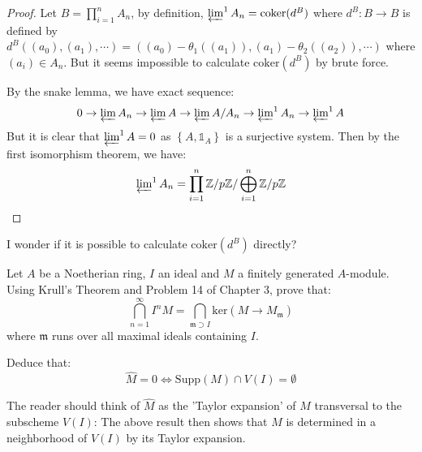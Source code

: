 \documentclass{solution}
\begin{document}
\begin{proof}
    Let $B = \prod\limits_{i = 1}^{n} A_n$, by definition, $\varprojlim^1 A_n = \mathrm{coker}(d^{B})$ where $d^{B}: B \rightarrow B$ is defined by $d^B((a_{0}), (a_1), \cdots) = ((a_0) - \theta_1((a_1)), (a_1) - \theta_2((a_2)), \cdots)$ where $(a_i) \in A_n$. But it seems impossible to calculate $\mathrm{coker}(d^B)$ by brute force.

    By the snake lemma, we have exact sequence:
    $$0 \rightarrow \varprojlim A_n \rightarrow \varprojlim A \rightarrow \varprojlim A / A_n \rightarrow \varprojlim\nolimits^1 A_n \rightarrow \varprojlim\nolimits^1 A$$
    But it is clear that $\varprojlim\nolimits^1 A = 0$ as $\left\lbrace A, \mathds{1}_A \right\rbrace$ is a surjective system. Then by the first isomorphism theorem, we have:
    $$\varprojlim\nolimits^1 A_n = \prod\limits_{i = 1}^{n} \mathbb{Z} / p \mathbb{Z} / \bigoplus\limits_{i = 1}^{n} \mathbb{Z} / p \mathbb{Z}$$
\end{proof}

{\color{red} I wonder if it is possible to calculate $\mathrm{coker}(d^B)$ directly? }

\begin{problem}
    Let $A$ be a Noetherian ring, $I$ an ideal and $M$ a finitely generated $A$-module. Using Krull's Theorem and Problem 14 of Chapter 3, prove that:
    $$\bigcap\limits_{n = 1}^{\infty} I^n M = \bigcap\limits_{\mathfrak{m} \supset I} \mathrm{ker}(M \rightarrow M_{\mathfrak{m}})$$
    where $\mathfrak{m}$ runs over all maximal ideals containing $I$.

    Deduce that:
    $$\hat{M} = 0 \Leftrightarrow \mathrm{Supp}(M) \cap V(I) = \emptyset$$

    The reader should think of $\hat{M}$ as the 'Taylor expansion' of $M$ transversal to the subscheme $V(I)$: The above result then shows that $M$ is determined in a neighborhood of $V(I)$ by its Taylor expansion.
\end{problem}
\end{document}
